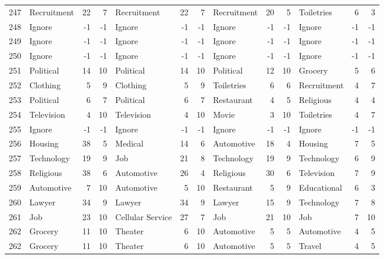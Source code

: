 \begin{figure}[htbp]
\begin{tabular}{rlrrlrrlrrlrr}
    247   & Recruitment & 22    & 7     & Recruitment & 22    & 7     & Recruitment & 20    & 5     & Toiletries & 6     & 3 \\
    248   & Ignore & -1    & -1    & Ignore & -1    & -1    & Ignore & -1    & -1    & Ignore & -1    & -1 \\
    249   & Ignore & -1    & -1    & Ignore & -1    & -1    & Ignore & -1    & -1    & Ignore & -1    & -1 \\
    250   & Ignore & -1    & -1    & Ignore & -1    & -1    & Ignore & -1    & -1    & Ignore & -1    & -1 \\
    251   & Political & 14    & 10    & Political & 14    & 10    & Political & 12    & 10    & Grocery & 5     & 6 \\
    252   & Clothing & 5     & 9     & Clothing & 5     & 9     & Toiletries & 6     & 6     & Recruitment & 4     & 7 \\
    253   & Political & 6     & 7     & Political & 6     & 7     & Restaurant & 4     & 5     & Religious & 4     & 4 \\
    254   & Television & 4     & 10    & Television & 4     & 10    & Movie & 3     & 10    & Toiletries & 4     & 7 \\
    255   & Ignore & -1    & -1    & Ignore & -1    & -1    & Ignore & -1    & -1    & Ignore & -1    & -1 \\
    256   & Housing & 38    & 5     & Medical & 14    & 6     & Automotive & 18    & 4     & Housing & 7     & 5 \\
    257   & Technology & 19    & 9     & Job   & 21    & 8     & Technology & 19    & 9     & Technology & 6     & 9 \\
    258   & Religious & 38    & 6     & Automotive & 26    & 4     & Religious & 30    & 6     & Television & 7     & 9 \\
    259   & Automotive & 7     & 10    & Automotive & 5     & 10    & Restaurant & 5     & 9     & Educational & 6     & 3 \\
    260   & Lawyer & 34    & 9     & Lawyer & 34    & 9     & Lawyer & 15    & 9     & Technology & 7     & 8 \\
    261   & Job   & 23    & 10    & Cellular Service & 27    & 7     & Job   & 21    & 10    & Job   & 7     & 10 \\
    262   & Grocery & 11    & 10    & Theater & 6     & 10    & Automotive & 5     & 5     & Automotive & 4     & 5 \\
    262   & Grocery & 11    & 10    & Theater & 6     & 10    & Automotive & 5     & 5     & Travel & 4     & 5 \\

\end{tabular}
\end{figure}
